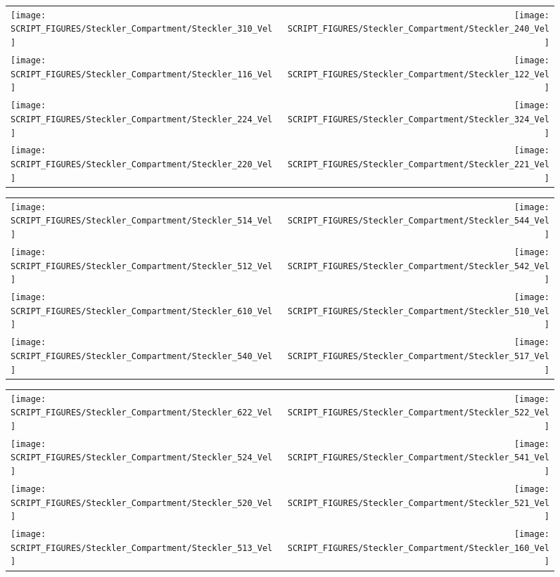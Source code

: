 \begin{figure}[p]
\begin{tabular*}{\textwidth}{l@{\extracolsep{\fill}}r}
\texttt{[image: SCRIPT\_FIGURES/Steckler\_Compartment/Steckler\_310\_Vel]} &
\texttt{[image: SCRIPT\_FIGURES/Steckler\_Compartment/Steckler\_240\_Vel]} \\
\texttt{[image: SCRIPT\_FIGURES/Steckler\_Compartment/Steckler\_116\_Vel]} &
\texttt{[image: SCRIPT\_FIGURES/Steckler\_Compartment/Steckler\_122\_Vel]} \\
\texttt{[image: SCRIPT\_FIGURES/Steckler\_Compartment/Steckler\_224\_Vel]} &
\texttt{[image: SCRIPT\_FIGURES/Steckler\_Compartment/Steckler\_324\_Vel]} \\
\texttt{[image: SCRIPT\_FIGURES/Steckler\_Compartment/Steckler\_220\_Vel]} &
\texttt{[image: SCRIPT\_FIGURES/Steckler\_Compartment/Steckler\_221\_Vel]}
\end{tabular*}
\label{Steckler_Vel_4}
\end{figure}

\begin{figure}[p]
\begin{tabular*}{\textwidth}{l@{\extracolsep{\fill}}r}
\texttt{[image: SCRIPT\_FIGURES/Steckler\_Compartment/Steckler\_514\_Vel]} &
\texttt{[image: SCRIPT\_FIGURES/Steckler\_Compartment/Steckler\_544\_Vel]} \\
\texttt{[image: SCRIPT\_FIGURES/Steckler\_Compartment/Steckler\_512\_Vel]} &
\texttt{[image: SCRIPT\_FIGURES/Steckler\_Compartment/Steckler\_542\_Vel]} \\
\texttt{[image: SCRIPT\_FIGURES/Steckler\_Compartment/Steckler\_610\_Vel]} &
\texttt{[image: SCRIPT\_FIGURES/Steckler\_Compartment/Steckler\_510\_Vel]} \\
\texttt{[image: SCRIPT\_FIGURES/Steckler\_Compartment/Steckler\_540\_Vel]} &
\texttt{[image: SCRIPT\_FIGURES/Steckler\_Compartment/Steckler\_517\_Vel]}
\end{tabular*}
\label{Steckler_Vel_5}
\end{figure}

\begin{figure}[p]
\begin{tabular*}{\textwidth}{l@{\extracolsep{\fill}}r}
\texttt{[image: SCRIPT\_FIGURES/Steckler\_Compartment/Steckler\_622\_Vel]} &
\texttt{[image: SCRIPT\_FIGURES/Steckler\_Compartment/Steckler\_522\_Vel]} \\
\texttt{[image: SCRIPT\_FIGURES/Steckler\_Compartment/Steckler\_524\_Vel]} &
\texttt{[image: SCRIPT\_FIGURES/Steckler\_Compartment/Steckler\_541\_Vel]} \\
\texttt{[image: SCRIPT\_FIGURES/Steckler\_Compartment/Steckler\_520\_Vel]} &
\texttt{[image: SCRIPT\_FIGURES/Steckler\_Compartment/Steckler\_521\_Vel]} \\
\texttt{[image: SCRIPT\_FIGURES/Steckler\_Compartment/Steckler\_513\_Vel]} &
\texttt{[image: SCRIPT\_FIGURES/Steckler\_Compartment/Steckler\_160\_Vel]}
\end{tabular*}
\label{Steckler_Vel_6}
\end{figure}

